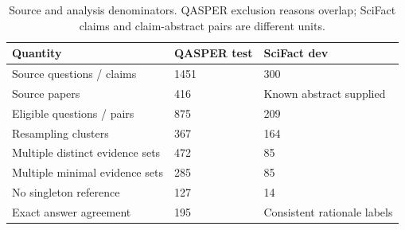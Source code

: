 \begin{table}[htbp]\centering\small\caption{Source and analysis denominators. QASPER exclusion reasons overlap; SciFact claims and claim-abstract pairs are different units.}
\begin{tabular}{p{204pt}p{96pt}p{96pt}}
\toprule
Quantity & QASPER test & SciFact dev \\
\midrule
Source questions / claims & 1451 & 300 \\
Source papers & 416 & Known abstract supplied \\
Eligible questions / pairs & 875 & 209 \\
Resampling clusters & 367 & 164 \\
Multiple distinct evidence sets & 472 & 85 \\
Multiple minimal evidence sets & 285 & 85 \\
No singleton reference & 127 & 14 \\
Exact answer agreement & 195 & Consistent rationale labels \\
\bottomrule\end{tabular}\end{table}
